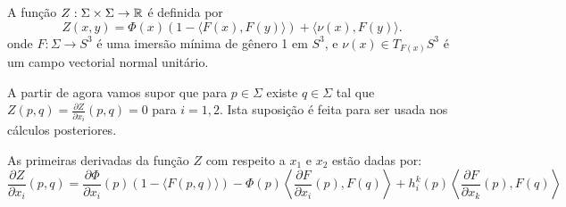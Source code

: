 \cite{Brendle2013}
\cite{Brendle2013a}





\begin{definicao}
	A função $Z: \Sigma \times \Sigma \rightarrow \mathbb{R}$ é definida por
	\begin{equation*}
		Z(x,y) =  \Phi(x) (1 - \langle F(x), F(y) \rangle) + \langle \nu(x), F(y) \rangle.
	\end{equation*}
	onde $F: \Sigma \rightarrow S^3$ é uma imersão mínima de gênero 1 em $S^3$, e $\nu(x) \in T_{F(x)} S^3$ é um campo vectorial normal unitário.
\end{definicao}

\begin{observacao}
	 A partir de agora vamos supor que para $p \in \Sigma$ existe $q \in \Sigma$ tal que $Z(p,q) = \frac{\partial Z}{\partial x_i}(p,q) = 0$ para $i = 1,2$. Ista suposição é feita para ser usada nos cálculos posteriores.
\end{observacao}

\begin{proposicao}\label{primeira_derivada_x_Z}
	As primeiras derivadas da função $Z$ com respeito a $x_1$ e $x_2$ estão dadas por:
	\begin{equation}\label{diff_Z_x}
	\frac{\partial Z}{\partial x_i} (p, q) =  \frac{\partial \Phi}{\partial x_i}(p) (1 - \langle F(p, q) \rangle) -  \Phi(p) \left\langle \frac{\partial F}{\partial x_i}(p), F(q) \right\rangle + h_i^k(p) \left\langle \frac{\partial F}{\partial x_k}(p), F(q) \right\rangle
	\end{equation}
\end{proposicao}


